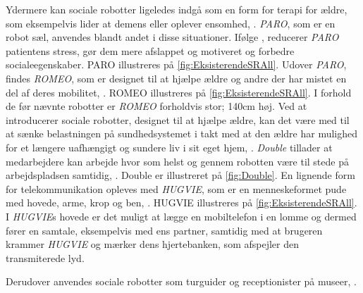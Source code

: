 Ydermere kan sociale robotter ligeledes indgå som en form for terapi for ældre, som eksempelvis lider at demens eller oplever ensomhed, \parencite[s. 110]{PDF:TheMobilePhoneAnEmontionalisedSR}. \textit{PARO}, som er en robot sæl, anvendes blandt andet i disse situationer. Ifølge \textcite{WEB:PARO}, reducerer \textit{PARO} patientens stress, gør dem mere afslappet og motiveret og forbedre socialeegenskaber. PARO illustreres på \autoref{fig:EksisterendeSRAll}. Udover \textit{PARO}, findes \textit{ROMEO}, som er designet til at hjælpe ældre og andre der har mistet en del af deres mobilitet, \parencite{WEB:ROMEO}. ROMEO illustreres på \autoref{fig:EksisterendeSRAll}. I forhold de før nævnte robotter er \textit{ROMEO} forholdvis stor; 140cm høj. Ved at introducerer sociale robotter, designet til at hjælpe ældre, kan det være med til at sænke belastningen på sundhedsystemet i takt med at den ældre har mulighed for et længere uafhængigt og sundere liv i sit eget hjem, \parencite[s. 1]{PDF:SharingALifeHarvey}.\blankline
% 
\textit{Double} tillader at medarbejdere kan arbejde hvor som helst og gennem robotten være til stede på arbejdspladsen samtidig, \parencite{WEB:Double}. Double er illustreret på \autoref{fig:Double}. En lignende form for telekommunikation opleves med \textit{HUGVIE}, som er en menneskeformet pude med hovede, arme, krop og ben, \parencite[s. 78]{PDF:MinimizingTheHuman}. HUGVIE illustreres på \autoref{fig:EksisterendeSRAll}. I \textit{HUGVIE}s hovede er det muligt at lægge en mobiltelefon i en lomme og dermed fører en samtale, eksempelvis med ens partner, samtidig med at brugeren krammer \textit{HUGVIE} og mærker dens hjertebanken, som afspejler den transmiterede lyd.

Derudover anvendes sociale robotter som turguider og receptionister på museer, \parencite[s. 22]{PDF:CloseButNotStuck}.